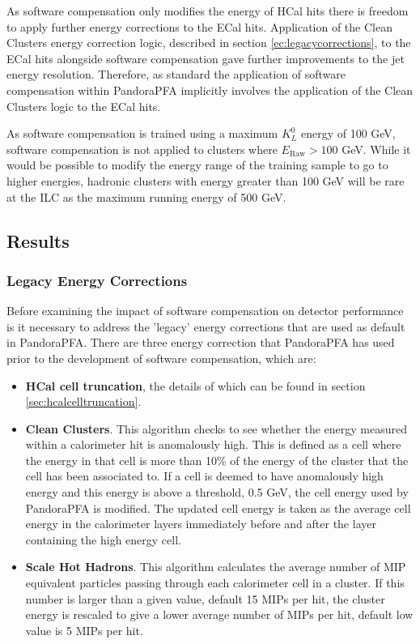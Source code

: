 As software compensation only modifies the energy of HCal hits there is freedom to apply further energy corrections to the ECal hits.  Application of the Clean Clusters energy correction logic, described in section \ref{ec:legacycorrections}, to the ECal hits alongside software compensation gave further improvements to the jet energy resolution.  Therefore, as standard the application of software compensation within PandoraPFA implicitly involves the application of the Clean Clusters logic to the ECal hits.  

As software compensation is trained using a maximum $K^{0}_{L}$ energy of 100 GeV, software compensation is not applied to clusters where $E_{\text{Raw}} > 100$ GeV.  While it would be possible to modify the energy range of the training sample to go to higher energies, hadronic clusters with energy greater than 100 GeV will be rare at the ILC as the maximum running energy of 500 GeV.  


\subsection{Results}


\subsubsection{Legacy Energy Corrections}
\label{sec:legacycorrections}
Before examining the impact of software compensation on detector performance is it necessary to address the 'legacy' energy corrections that are used as default in PandoraPFA.  There are three energy correction that PandoraPFA has used prior to the development of software compensation, which are:

\begin{itemize}
\item \textbf{HCal cell truncation}, the details of which can be found in section \ref{sec:hcalcelltruncation}.
\item \textbf{Clean Clusters}.  This algorithm checks to see whether the energy measured within a calorimeter hit is anomalously high.  This is defined as a cell where the energy in that cell is more than 10\% of the energy of the cluster that the cell has been associated to.  If a cell is deemed to have anomalously high energy and this energy is above a threshold, 0.5 GeV, the cell energy used by PandoraPFA is modified.  The updated cell energy is taken as the average cell energy in the calorimeter layers immediately before and after the layer containing the high energy cell.    
\item \textbf{Scale Hot Hadrons}.  This algorithm calculates the average number of MIP equivalent particles passing through each calorimeter cell in a cluster.  If this number is larger than a given value, default 15 MIPs per hit, the cluster energy is rescaled to give a lower average number of MIPs per hit, default low value is 5 MIPs per hit.  
\end{itemize}

